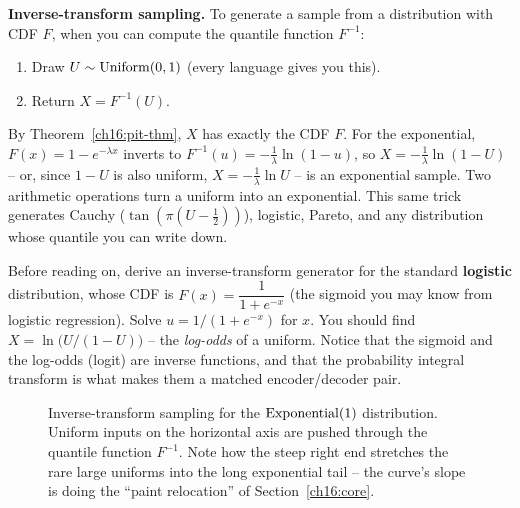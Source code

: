 \begin{applicationbox}
\textbf{Inverse-transform sampling.} To generate a sample from a distribution with CDF $F$,
when you can compute the quantile function $F^{-1}$:
\begin{enumerate}
  \item Draw $U \sim \operatorname{Uniform}(0,1)$ (every language gives you this).
  \item Return $X = F^{-1}(U)$.
\end{enumerate}
By Theorem~\ref{ch16:pit-thm}, $X$ has exactly the CDF $F$. For the exponential, $F(x) =
1 - e^{-\lambda x}$ inverts to $F^{-1}(u) = -\tfrac{1}{\lambda}\ln(1-u)$, so
$X = -\tfrac{1}{\lambda}\ln(1-U)$ -- or, since $1-U$ is also uniform,
$X = -\tfrac{1}{\lambda}\ln U$ -- is an exponential sample. Two arithmetic operations turn
a uniform into an exponential. This same trick generates Cauchy ($\tan(\pi(U-\tfrac12))$),
logistic, Pareto, and any distribution whose quantile you can write down.
\end{applicationbox}

\begin{labbox}
Before reading on, derive an inverse-transform generator for the standard \textbf{logistic}
distribution, whose CDF is $F(x) = \dfrac{1}{1+e^{-x}}$ (the sigmoid you may know from
logistic regression). Solve $u = 1/(1+e^{-x})$ for $x$. You should find
$X = \ln\!\big(U/(1-U)\big)$ -- the \emph{log-odds} of a uniform. Notice that the sigmoid
and the log-odds (logit) are inverse functions, and that the probability integral
transform is what makes them a matched encoder/decoder pair.
\end{labbox}

\begin{figure}[H]
\centering
{}
\caption{Inverse-transform sampling for the $\operatorname{Exponential}(1)$ distribution. Uniform inputs on the
horizontal axis are pushed through the quantile function $F^{-1}$. Note how the steep right
end stretches the rare large uniforms into the long exponential tail -- the curve's slope
is doing the ``paint relocation'' of Section~\ref{ch16:core}.}
\label{ch16:fig-pit}
\end{figure}

